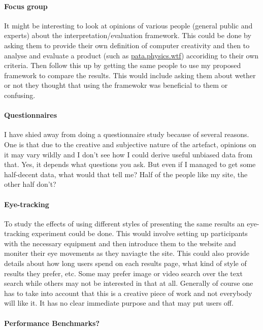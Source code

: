 \documentclass[11pt]{thesis} %
\begin{document}
\paragraph{Focus group}
It might be interesting to look at opinions of various people (general public and experts) about the interpretation/evaluation framework. This could be done by asking them to provide their own definition of computer creativity and then to analyse and evaluate a product (such as \url{pata.physics.wtf}) accoriding to their own criteria. Then follow this up by getting the same people to use my proposed framework to compare the results. This would include asking them about wether or not they thought that using the framewokr was beneficial to them or confusing.

\paragraph{Questionnaires}
I have shied away from doing a questionnaire study because of several reasons. One is that due to the creative and subjective nature of the artefact, opinions on it may vary wildly and I don't see how I could derive useful unbiased data from that. Yes, it depends what questions you ask. But even if I managed to get some half-decent data, what would that tell me? Half of the people like my site, the other half don't?


\paragraph{Eye-tracking}
To study the effects of using different styles of presenting the same results an eye-tracking experiment could be done. This would involve setting up participants with the necessary equipment and then introduce them to the website and moniter their eye movements as they naviagte the site. This could also provide details about how long users spend on each results page, what kind of style of results they prefer, etc. Some may prefer image or video search over the text search while others may not be interested in that at all. Generally of course one has to take into account that this is a creative piece of work and not everybody will like it. It has no clear immediate purpose and that may put users off.

\paragraph{Performance Benchmarks?}
\end{document}
